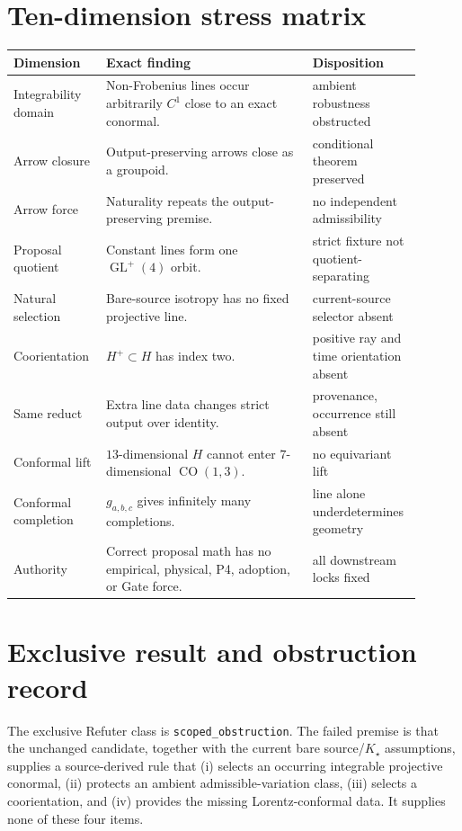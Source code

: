\documentclass[11pt]{article}
\newcommand{\GL}{\operatorname{GL}}
\newcommand{\CO}{\operatorname{CO}}
\begin{document}
\section{Ten-dimension stress matrix}

\begin{center}
\small
\begin{tabular}{p{0.20\linewidth}p{0.48\linewidth}p{0.22\linewidth}}
\toprule
Dimension & Exact finding & Disposition \\
\midrule
Integrability domain & Non-Frobenius lines occur arbitrarily $C^1$ close to an exact conormal. & ambient robustness obstructed \\
Arrow closure & Output-preserving arrows close as a groupoid. & conditional theorem preserved \\
Arrow force & Naturality repeats the output-preserving premise. & no independent admissibility \\
Proposal quotient & Constant lines form one $\GL^+(4)$ orbit. & strict fixture not quotient-separating \\
Natural selection & Bare-source isotropy has no fixed projective line. & current-source selector absent \\
Coorientation & $H^+\subset H$ has index two. & positive ray and time orientation absent \\
Same reduct & Extra line data changes strict output over identity. & provenance, occurrence still absent \\
Conformal lift & $13$-dimensional $H$ cannot enter $7$-dimensional $\CO(1,3)$. & no equivariant lift \\
Conformal completion & $g_{a,b,c}$ gives infinitely many completions. & line alone underdetermines geometry \\
Authority & Correct proposal math has no empirical, physical, P4, adoption, or Gate force. & all downstream locks fixed \\
\bottomrule
\end{tabular}
\end{center}

\section{Exclusive result and obstruction record}

The exclusive Refuter class is \texttt{scoped\_obstruction}.  The failed
premise is that the unchanged candidate, together with the current bare
source/$K_\star$ assumptions, supplies a source-derived rule that (i) selects
an occurring integrable projective conormal, (ii) protects an ambient
admissible-variation class, (iii) selects a coorientation, and (iv) provides
the missing Lorentz-conformal data.  It supplies none of these four items.
\end{document}
